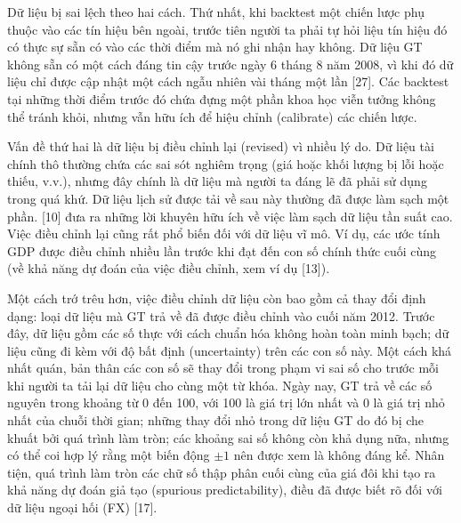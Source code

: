 Dữ liệu bị sai lệch theo hai cách. Thứ nhất, khi backtest một chiến lược phụ thuộc vào các tín hiệu bên ngoài, trước tiên người ta phải tự hỏi liệu tín hiệu đó có thực sự sẵn có vào các thời điểm mà nó ghi nhận hay không. Dữ liệu GT không sẵn có một cách đáng tin cậy trước ngày 6 tháng 8 năm 2008, vì khi đó dữ liệu chỉ được cập nhật một cách ngẫu nhiên vài tháng một lần [27]. Các backtest tại những thời điểm trước đó chứa đựng một phần khoa học viễn tưởng không thể tránh khỏi, nhưng vẫn hữu ích để hiệu chỉnh (calibrate) các chiến lược.

Vấn đề thứ hai là dữ liệu bị điều chỉnh lại (revised) vì nhiều lý do. Dữ liệu tài chính thô thường chứa các sai sót nghiêm trọng (giá hoặc khối lượng bị lỗi hoặc thiếu, v.v.), nhưng đây chính là dữ liệu mà người ta đáng lẽ đã phải sử dụng trong quá khứ. Dữ liệu lịch sử được tải về sau này thường đã được làm sạch một phần. [10] đưa ra những lời khuyên hữu ích về việc làm sạch dữ liệu tần suất cao. Việc điều chỉnh lại cũng rất phổ biến đối với dữ liệu vĩ mô. Ví dụ, các ước tính GDP được điều chỉnh nhiều lần trước khi đạt đến con số chính thức cuối cùng (về khả năng dự đoán của việc điều chỉnh, xem ví dụ [13]).

Một cách trớ trêu hơn, việc điều chỉnh dữ liệu còn bao gồm cả thay đổi định dạng: loại dữ liệu mà GT trả về đã được điều chỉnh vào cuối năm 2012. Trước đây, dữ liệu gồm các số thực với cách chuẩn hóa không hoàn toàn minh bạch; dữ liệu cũng đi kèm với độ bất định (uncertainty) trên các con số này. Một cách khá nhất quán, bản thân các con số sẽ thay đổi trong phạm vi sai số cho trước mỗi khi người ta tải lại dữ liệu cho cùng một từ khóa. Ngày nay, GT trả về các số nguyên trong khoảng từ 0 đến 100, với 100 là giá trị lớn nhất và 0 là giá trị nhỏ nhất của chuỗi thời gian; những thay đổi nhỏ trong dữ liệu GT do đó bị che khuất bởi quá trình làm tròn; các khoảng sai số không còn khả dụng nữa, nhưng có thể coi hợp lý rằng một biến động $\pm 1$ nên được xem là không đáng kể. Nhân tiện, quá trình làm tròn các chữ số thập phân cuối cùng của giá đôi khi tạo ra khả năng dự đoán giả tạo (spurious predictability), điều đã được biết rõ đối với dữ liệu ngoại hối (FX) [17].

